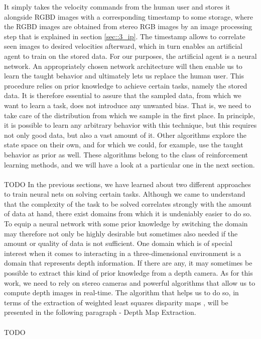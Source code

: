 It simply takes the velocity commands from the human user and stores it alongside RGBD images with a corresponding timestamp to some storage, where the RGBD images are obtained from stereo RGB images by an image processing step that is explained in section \ref{sec::3_ip}. The timestamp allows to correlate seen images to desired velocities afterward, which in turn enables an artificial agent to train on the stored data. For our purposes, the artificial agent is a neural network. An appropriately chosen network architecture will then enable us to learn the taught behavior and ultimately lets us replace the human user. This procedure relies on prior knowledge to achieve certain tasks, namely the stored data. It is therefore essential to assure that the sampled data, from which we want to learn a task, does not introduce any unwanted bias. That is, we need to take care of the distribution from which we sample in the first place. In principle, it is possible to learn any arbitrary behavior with this technique, but this requires not only good data, but also a vast amount of it. Other algorithms explore the state space on their own, and for which we could, for example, use the taught behavior as prior as well. These algorithms belong to the class of reinforcement learning methods, and we will have a look at a particular one in the next section.
\\\\ TODO
In the previous sections, we have learned about two different approaches to train neural nets on solving certain tasks. Although we came to understand that the complexity of the task to be solved correlates strongly with the amount of data at hand, there exist domains from which it is undeniably easier to do so. To equip a neural network with some prior knowledge by switching the domain may therefore not only be highly desirable but sometimes also needed if the amount or quality of data is not sufficient. One domain which is of special interest when it comes to interacting in a three-dimensional environment is a domain that represents depth information. If there are any, it may sometimes be possible to extract this kind of prior knowledge from a depth camera. As for this work, we need to rely on stereo cameras and powerful algorithms that allow us to compute depth images in real-time. The algorithm that helps us to do so, in terms of the extraction of weighted least squares disparity maps \cite{min2014fast}, will be presented in the following paragraph - Depth Map Extraction.
\\\\ TODO
